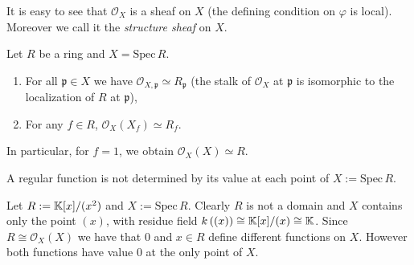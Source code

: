 \begin{rem}
	It is easy to see that $\mathcal{O}_{X}$ is a sheaf on $X$ (the defining condition
	on $\varphi$ is local).
	Moreover we call it the {\em structure sheaf} on $X$.
\end{rem}

\begin{prop}
	Let $R$ be a ring and $X = \mathrm{Spec}\, R$.
	\begin{enumerate}
		\item For all $\mathfrak{p} \in X$ we have $\mathcal{O}_{X, \mathfrak{p}} \simeq R_{\mathfrak{p}}$
			(the stalk of $\mathcal{O}_X$ at $\mathfrak{p}$ is isomorphic to the
			localization of $R$ at $\mathfrak{p}$),
		\item For any $f \in R$, $\mathcal{O}_{X} \left( X_f \right) \simeq R_f$.
	\end{enumerate}
	In particular, for $f = 1$, we obtain $\mathcal{O}_{X} \left( X \right) \simeq R$.
\end{prop} 

\begin{rem}[]
	A regular function is not determined by its value at each point of $X := \mathrm{Spec}\, R.$
\end{rem}

\begin{ex}
	Let $R := \mathbb{K}[x]/ (x^2)$ and $X := \mathrm{Spec}\, R$.
	Clearly $R$ is not a domain and $X$ contains only the point $(x)$,
	with residue field $k \left( (x) \right) \cong \mathbb{K}[x]/ (x) \cong \mathbb{K}$.
	Since $R \cong \mathcal{O}_{X} \left( X \right)$ we have that $0$ and $x \in R$ define different functions on $X$.
	However both functions have value $0$ at the only point of $X$.
\end{ex} 

